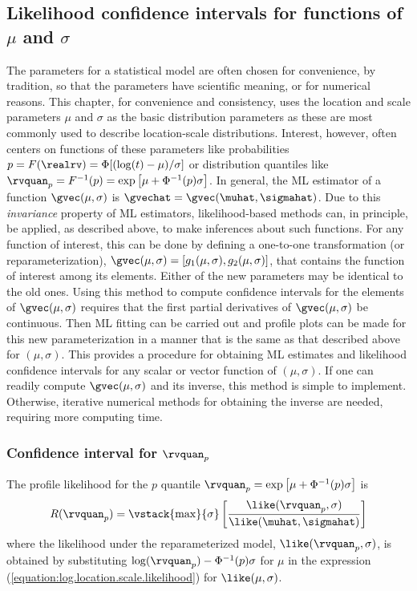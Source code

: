 \subsection{Likelihood confidence intervals for 
functions of $\mu$ and $\sigma$}
\label{section:profile.on.functions}
The parameters for a statistical model are often chosen for
convenience, by tradition, so that the parameters have scientific
meaning, or for numerical reasons.  This chapter, for convenience
and consistency, uses the location and scale parameters $\mu$ and
$\sigma$ as the basic distribution parameters as these are most 
commonly used to
describe location-scale distributions.  
Interest, however, often centers on
functions of these parameters like probabilities $p=F(\realrv)=
\Phi[(\log(t)-\mu)/\sigma]$
or distribution quantiles like $\rvquan_{p}=F^{-1}(p)=
\exp \left [\mu+\Phi^{-1}(p)\sigma \right ]$.
In general, the ML estimator of a function $\gvec(\mu,\sigma)$
is $\gvechat=\gvec(\muhat,\sigmahat)$. Due to this {\em invariance}
property of ML estimators, likelihood-based methods can, in
principle, be applied, as described above, to make inferences about
such functions.  For any function of interest, this can be done
by defining a one-to-one transformation (or reparameterization),
$\gvec(\mu,\sigma)=[g_{1}(\mu,\sigma),g_{2}(\mu,\sigma)]$, that
contains the function of interest among its elements.  Either of the new
parameters may be identical to the old ones.  Using this method to
compute confidence intervals for the elements of $\gvec(\mu,\sigma)$
requires that the first partial derivatives of $\gvec(\mu,\sigma)$ be
continuous.  Then ML fitting can be carried out 
and profile plots can be made for this new
parameterization in a manner that is the same as that described above
for $(\mu,\sigma)$. This provides a procedure for obtaining
ML estimates and likelihood confidence intervals for
any scalar or vector function of $(\mu,\sigma)$.  If one can readily
compute $\gvec(\mu,\sigma)$ and its inverse, this method is simple to
implement.  Otherwise, iterative numerical methods for obtaining the
inverse are needed, requiring more computing time.

\subsubsection{Confidence interval for $\rvquan_{p}$}
The profile likelihood for the $p$ quantile $\rvquan_{p}=\exp \left
[\mu+\Phi^{-1}(p)\sigma \right ]$ is
\begin{displaymath}
R(\rvquan_{p}) = \vstack{\max}{\sigma}
\left[\frac{\like(\rvquan_{p},\sigma)}
{\like(\muhat, \sigmahat)}\right]
\end{displaymath}
where the likelihood under the reparameterized model,
$\like(\rvquan_{p},\sigma)$, is obtained by substituting
$\log(\rvquan_{p})-\Phi^{-1}(p)\sigma$ for $\mu$ in the expression
(\ref{equation:log.location.scale.likelihood}) for $\like(\mu, \sigma)$. 

